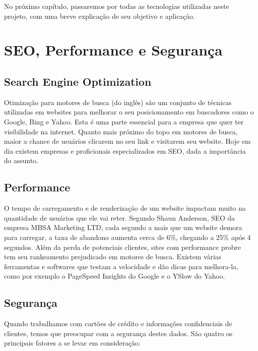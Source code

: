 \documentclass[
	12pt,				%
    oneside,			%
	a4paper,			%
	english,			%
	french,				%
	spanish,			%
	brazil				%
	]{abntex2}
\begin{document}
No próximo capítulo, passaremos por todas as tecnologias utilizadas neste projeto, com uma breve explicação de seu objetivo e aplicação.

\section{SEO, Performance e Segurança}

\subsection{Search Engine Optimization}

Otimização para motores de busca (do inglês) são um conjunto de técnicas utilizadas em websites para melhorar o seu posicionamento em buscadores como o Google, Bing e Yahoo. Esta é uma parte essencial para a empresa que quer ter visibilidade na internet. Quanto mais próximo do topo em motores de busca, maior a chance de usuários clicarem no seu link e visitarem seu website. Hoje em dia existem empresas e proficionais especializados em SEO, dada a importância do assunto.

\subsection{Performance}

O tempo de carregamento e de renderização de um website impactam muito na quantidade de usuários que ele vai reter. Segundo Shaun Anderson\cite{LoadTime}, SEO da empresa MBSA Marketing LTD, cada segundo a mais que um website demora para carregar, a taxa de abandono aumenta cerca de 6\%, chegando a 25\% após 4 segundos. Além da perda de potenciais clientes, sites com performance probre tem seu rankeamento prejudicado em motores de busca. Existem várias ferramentas e softwares que testam a velocidade e dão dicas para melhora-la, como por exemplo o PageSpeed Insights do Google e o YSlow do Yahoo.

\subsection{Segurança}

Quando trabalhamos com cartões de crédito e informações confidenciais de clientes, temos que preocupar com a segurança destes dados. São quatro os principais fatores a se levar em consideração\cite{SecurityEcommerce}:
\end{document}
